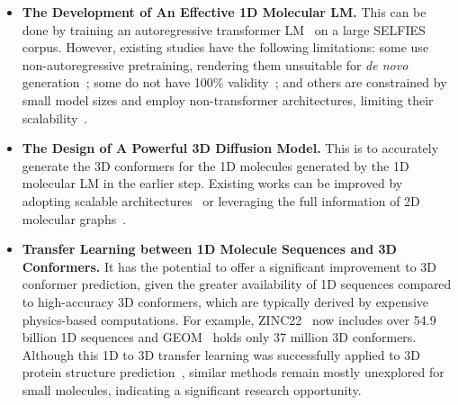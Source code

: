 \begin{itemize}[leftmargin=*]
\item \textbf{The Development of An Effective 1D Molecular LM.} This can be done by training an autoregressive transformer LM~\citep{Transformer} on a large SELFIES corpus. However, existing studies have the following limitations: some use non-autoregressive pretraining, rendering them unsuitable for \textit{de novo} generation~\citep{MolGen,Chemformer,RegressionTransformer,SELFormer}; some do not have 100\% validity~\citep{MolGPT}; and others are constrained by small model sizes and employ non-transformer architectures, limiting their scalability~\citep{moses,LIMO,RandomSmiles,JT-VAE}.
\item \textbf{The Design of A Powerful 3D Diffusion Model.} This is to accurately generate the 3D conformers for the 1D molecules generated by the 1D molecular LM in the earlier step. Existing works can be improved by adopting scalable architectures~\citep{torsion,ParticleGuidance,GeoDiff,GeoMol} or leveraging the full information of 2D molecular graphs~\citep{MCF}.
\item \textbf{Transfer Learning between 1D Molecule Sequences and 3D Conformers.} It has the potential to offer a significant improvement to 3D conformer prediction, given the greater availability of 1D sequences compared to high-accuracy 3D conformers, which are typically derived by expensive physics-based computations. For example, ZINC22~\citep{ZINC22} now includes over 54.9 billion 1D sequences
and GEOM~\citep{GEOM} holds only 37 million 3D conformers. Although this 1D to 3D transfer learning was successfully applied to 3D protein structure prediction~\citep{ESM2,OmegaFold}, similar methods remain mostly unexplored for small molecules, indicating a significant research opportunity.
\end{itemize}
\vspace{-1mm}

